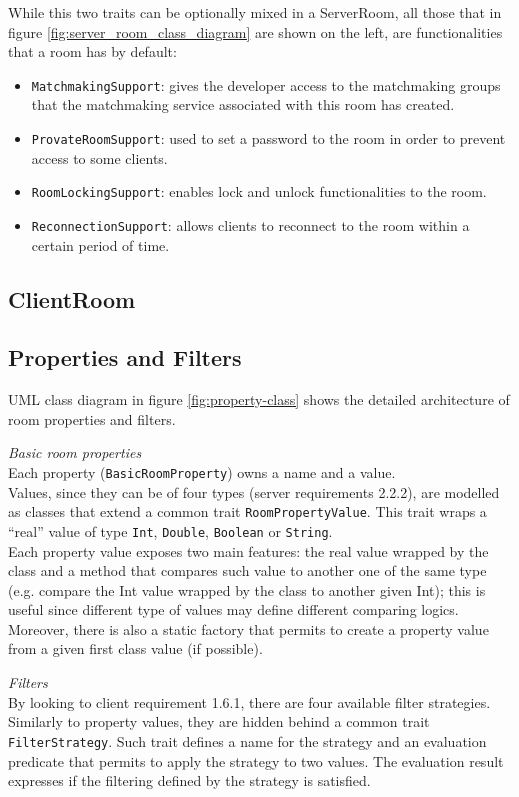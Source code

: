 While this two traits can be optionally mixed in a ServerRoom, all those that in figure \ref{fig:server_room_class_diagram} are shown on the left, are functionalities that a room has by default:
\begin{itemize}
	\item \texttt{MatchmakingSupport}: gives the developer access to the matchmaking groups that the matchmaking service associated with this room has created.
	\item \texttt{ProvateRoomSupport}: used to set a password to the room in order to prevent access to some clients.
	\item \texttt{RoomLockingSupport}: enables lock and unlock functionalities to the room. 
	\item \texttt{ReconnectionSupport}: allows clients to reconnect to the room within a certain period of time.
\end{itemize}

\subsection{ClientRoom}

\subsection{Properties and Filters}

UML class diagram in figure \ref{fig:property-class} shows the detailed architecture of room properties and filters.

\bigskip
\textit{Basic room properties}
\\
Each property (\texttt{BasicRoomProperty}) owns a name and a value.
\\
Values, since they can be of four types (server requirements 2.2.2), are modelled as classes that extend a common trait \texttt{RoomPropertyValue}. This trait wraps a ``real'' value of type \texttt{Int}, \texttt{Double}, \texttt{Boolean} or \texttt{String}.
\\
Each property value exposes two main features: the real value wrapped by the class and a method that compares such value to another one of the same type (e.g. compare the Int value wrapped by the class to another given Int); this is useful since different type of values may define different comparing logics.
Moreover, there is also a static factory that permits to create a property value from a given first class value (if possible).

\bigskip
\textit{Filters}
\\
By looking to client requirement 1.6.1, there are four available filter strategies. Similarly to property values, they are hidden behind a common trait \texttt{FilterStrategy}. Such trait defines a name for the strategy and an evaluation predicate that permits to apply the strategy to two values. The evaluation result expresses if the filtering defined by the strategy is satisfied.

